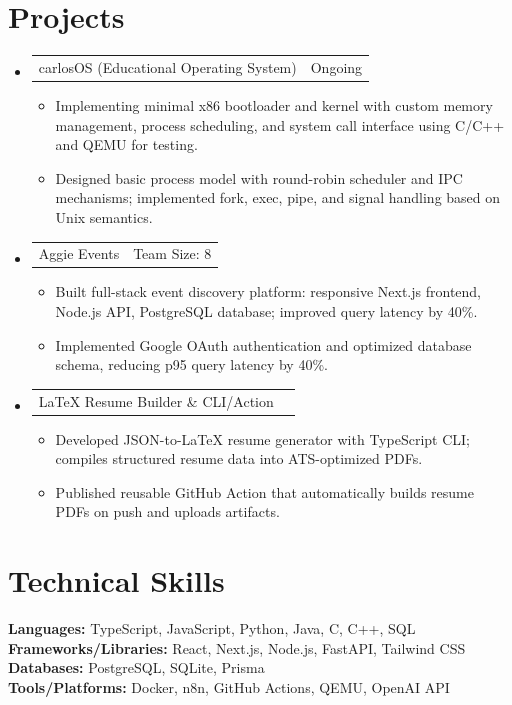 \documentclass[letterpaper,11pt]{article}
\makeatletter
\newcommand{\resumeItem}[1]{
  \item\small{{#1 \vspace{-2pt}}}
}
\newcommand{\resumeProjectHeading}[2]{
  \item
  \begin{tabular*}{0.97\textwidth}{l@{\extracolsep{\fill}}r}
    \small#1 & #2 \\
  \end{tabular*}\vspace{-7pt}
}
\newcommand{\resumeSubHeadingListStart}{\begin{itemize}[leftmargin=0.15in, label={}]}
\newcommand{\resumeSubHeadingListEnd}{\end{itemize}}
\newcommand{\resumeItemListStart}{\begin{itemize}}
\newcommand{\resumeItemListEnd}{\end{itemize}\vspace{-5pt}}
\makeatother
\begin{document}
\section{Projects}
\resumeSubHeadingListStart

\resumeProjectHeading
{carlosOS (Educational Operating System)}{Ongoing}
\resumeItemListStart
\resumeItem{Implementing minimal x86 bootloader and kernel with custom memory management, process scheduling, and system call interface using C/C++ and QEMU for testing.}
\resumeItem{Designed basic process model with round-robin scheduler and IPC mechanisms; implemented fork, exec, pipe, and signal handling based on Unix semantics.}
\resumeItemListEnd

\resumeProjectHeading
{Aggie Events}{Team Size: 8}{}
\resumeItemListStart
\resumeItem{Built full-stack event discovery platform: responsive Next.js frontend, Node.js API, PostgreSQL database; improved query latency by 40\%.}
\resumeItem{Implemented Google OAuth authentication and optimized database schema, reducing p95 query latency by 40\%.}
\resumeItemListEnd

\resumeProjectHeading
{LaTeX Resume Builder \& CLI/Action}{}
\resumeItemListStart
\resumeItem{Developed JSON-to-LaTeX resume generator with TypeScript CLI; compiles structured resume data into ATS-optimized PDFs.}
\resumeItem{Published reusable GitHub Action that automatically builds resume PDFs on push and uploads artifacts.}
\resumeItemListEnd

\resumeSubHeadingListEnd

\section{Technical Skills}
\begin{itemize}[leftmargin=0.15in, label={}]
  \small{\item{
    \textbf{Languages:} TypeScript, JavaScript, Python, Java, C, C++, SQL \\
    \textbf{Frameworks/Libraries:} React, Next.js, Node.js, FastAPI, Tailwind CSS \\
    \textbf{Databases:} PostgreSQL, SQLite, Prisma \\
    \textbf{Tools/Platforms:} Docker, n8n, GitHub Actions, QEMU, OpenAI API
  }}
\end{itemize}
\end{document}
